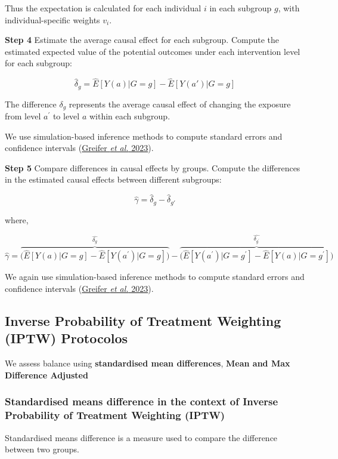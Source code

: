 \documentclass[
  singlecolumn]{article}
\begin{document}
Thus the expectation is calculated for each individual \(i\) in each
subgroup \(g\), with individual-specific weights \(v_i\).

\textbf{Step 4} Estimate the average causal effect for each subgroup.
Compute the estimated expected value of the potential outcomes under
each intervention level for each subgroup:

\[\hat{\delta}_g = \hat{E}[Y(a)|G=g] - \hat{E}[Y(a')|G=g]\]

The difference \(\delta_g\) represents the average causal effect of
changing the exposure from level \(a^{\prime}\) to level \(a\) within
each subgroup.

We use simulation-based inference methods to compute standard errors and
confidence intervals (\hyperref[ref-greifer2023]{Greifer \emph{et al.}
2023}).

\textbf{Step 5} Compare differences in causal effects by groups. Compute
the differences in the estimated causal effects between different
subgroups:

\[\hat{\gamma} = \hat{\delta}_g - \hat{\delta}_{g'}\]

where,

\[\hat{\gamma} = \overbrace{\big( \hat{E}[Y(a)|G=g] - \hat{E}[Y(a^{\prime})|G=g] \big)}^{\hat{\delta_g}} - \overbrace{\big(\hat{E}[Y(a^{\prime})|G=g^{\prime}]- \hat{E}[Y(a)|G=g^{\prime}]\big)}^{\hat{\delta_{g^{\prime}}}}\]

We again use simulation-based inference methods to compute standard
errors and confidence intervals (\hyperref[ref-greifer2023]{Greifer
\emph{et al.} 2023}).

\subsection{Inverse Probability of Treatment Weighting (IPTW)
Protocolos}\label{inverse-probability-of-treatment-weighting-iptw-protocolos}

We assess balance using \textbf{standardised mean differences},
\textbf{Mean and Max Difference Adjusted}

\subsubsection{Standardised means difference in the context of Inverse
Probability of Treatment Weighting
(IPTW)}\label{standardised-means-difference-in-the-context-of-inverse-probability-of-treatment-weighting-iptw}

Standardised means difference is a measure used to compare the
difference between two groups.
\end{document}
